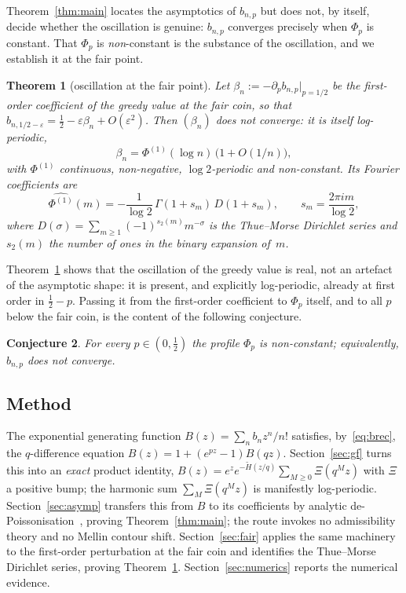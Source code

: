 \documentclass[11pt]{article}
\newtheorem{theorem}{Theorem}[section]
\newtheorem{conjecture}[theorem]{Conjecture}
\theoremstyle{definition}
\begin{document}
Theorem~\ref{thm:main} locates the asymptotics of $b_{n,p}$ but does
not, by itself, decide whether the oscillation is genuine: $b_{n,p}$
converges precisely when $\Phi_p$ is constant. That $\Phi_p$ is
\emph{non}-constant is the substance of the oscillation, and we
establish it at the fair point.

\begin{theorem}[oscillation at the fair point]\label{thm:fair}
  Let $\beta_n:=-\partial_p b_{n,p}\big|_{p=1/2}$ be the first-order
  coefficient of the greedy value at the fair coin, so that
  $b_{n,1/2-\varepsilon}=\tfrac12-\varepsilon\beta_n+O(\varepsilon^2)$.
  Then $(\beta_n)$ does not converge: it is itself log-periodic,
  \[
    \beta_n=\Phi^{(1)}(\log n)\,\bigl(1+O(1/n)\bigr),
  \]
  with $\Phi^{(1)}$ continuous, non-negative, $\log2$-periodic and
  non-constant. Its Fourier coefficients are
  \[
    \widehat{\Phi^{(1)}}(m)=-\frac1{\log2}\,\Gamma(1+s_m)\,D(1+s_m),
    \qquad s_m=\frac{2\pi i m}{\log2},
  \]
  where $D(\sigma)=\sum_{m\ge1}(-1)^{s_2(m)}m^{-\sigma}$ is the
  Thue--Morse Dirichlet series and $s_2(m)$ the number of ones in the
  binary expansion of~$m$.
\end{theorem}

Theorem~\ref{thm:fair} shows that the oscillation of the greedy value
is real, not an artefact of the asymptotic shape: it is present, and
explicitly log-periodic, already at first order in $\tfrac12-p$.
Passing it from the first-order coefficient to $\Phi_p$ itself, and to
all $p$ below the fair coin, is the content of the following
conjecture.

\begin{conjecture}\label{conj:nonconst}
  For every $p\in(0,\tfrac12)$ the profile $\Phi_p$ is non-constant;
  equivalently, $b_{n,p}$ does not converge.
\end{conjecture}

\subsection{Method}\label{sec:method}

The exponential generating function $B(z)=\sum_nb_nz^n/n!$ satisfies,
by~\eqref{eq:brec}, the $q$-difference equation $B(z)=1+(e^{pz}-1)
B(qz)$. Section~\ref{sec:gf} turns this into an \emph{exact} product
identity, $B(z)=e^ze^{-\tilde H(z/q)}\sum_{M\ge0}\Xi(q^Mz)$ with $\Xi$
a positive bump; the harmonic sum $\sum_M\Xi(q^Mz)$ is manifestly
log-periodic. Section~\ref{sec:asymp} transfers this from $B$ to its
coefficients by analytic de-Poissonisation~\cite{JS}, proving
Theorem~\ref{thm:main}; the route invokes no admissibility theory and
no Mellin contour shift. Section~\ref{sec:fair} applies the same
machinery to the first-order perturbation at the fair coin and
identifies the Thue--Morse Dirichlet series, proving
Theorem~\ref{thm:fair}. Section~\ref{sec:numerics} reports the
numerical evidence.
\end{document}
